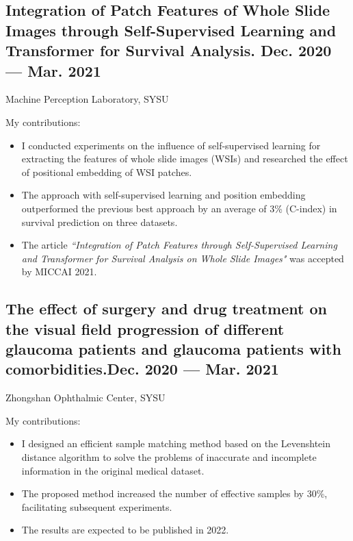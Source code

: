 \documentclass[a4,11pt]{article}
\newcommand{\subtext}[1]{
#1\par\vspace{-0.2cm}}
\begin{document}
\subsection*{Integration of Patch Features of Whole Slide Images through Self-Supervised Learning and Transformer for Survival Analysis. \hfill Dec. 2020 --- Mar. 2021}
\subtext{Machine Perception Laboratory, SYSU}  
\vspace {6pt}
My contributions:
    \begin{itemize}[topsep = 0 pt, itemsep = 0 pt, parsep = 1 pt]
        \item I conducted experiments on the influence of self-supervised learning for extracting the features of whole slide images (WSIs) and researched the effect of positional embedding of WSI patches. 
		\item The approach with self-supervised learning and position embedding outperformed the previous best approach by an average of 3\% (C-index) in survival prediction on three datasets.
		\item The article \textit{``Integration of Patch Features through Self-Supervised Learning and Transformer for Survival Analysis on Whole Slide Images"} was accepted by MICCAI 2021.
    \end{itemize}



\subsection*{The effect of surgery and drug treatment on the visual field progression of different glaucoma patients and glaucoma patients with comorbidities.\hfill Dec. 2020 --- Mar. 2021} 
\subtext{Zhongshan Ophthalmic Center, SYSU }
\vspace {6pt}
My contributions:
    \begin{itemize}[topsep = 0 pt, itemsep = 0 pt, parsep = 1 pt]
       \item I designed an efficient sample matching method based on the Levenshtein distance algorithm to solve the problems of inaccurate and incomplete information in the original medical dataset.  
		\item The proposed method increased the number of effective samples by 30\%, facilitating subsequent experiments.
		\item The results are expected to be published in 2022.

    \end{itemize}
\end{document}
